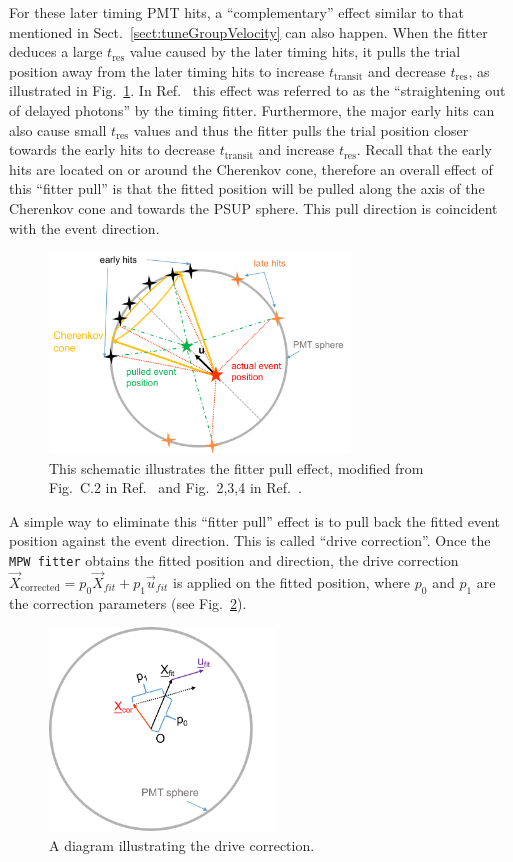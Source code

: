 For these later timing PMT hits, a ``complementary'' effect similar to that mentioned in Sect.~\ref{sect:tuneGroupVelocity} can also happen. When the fitter deduces a large $t_\mathrm{res}$ value caused by the later timing hits, it pulls the trial position away from the later timing hits to increase $t_\mathrm{transit}$ and decrease $t_\mathrm{res}$, as illustrated in Fig.~\ref{fitterPull}. In Ref.~\cite{driveCorPeter} this effect was referred to as the ``straightening out of delayed photons'' by the timing fitter. Furthermore, the major early hits can also cause small $t_\mathrm{res}$ values and thus the fitter pulls the trial position closer towards the early hits to decrease $t_\mathrm{transit}$ and increase $t_\mathrm{res}$. Recall that the early hits are located on or around the Cherenkov cone, therefore an overall effect of this ``fitter pull'' is that the fitted position will be pulled along the axis of the Cherenkov cone and towards the PSUP sphere. This pull direction is coincident with the event direction.

\begin{figure}[!htb]
	\centering
	\includegraphics[width=8cm]{fitterPull.png}
\caption[A cartoon shows fitter pull effect.]{This schematic illustrates the fitter pull effect, modified from Fig.~C.2 in Ref.~\cite{brice1996monte} and Fig.~2,3,4 in Ref.~\cite{driveCorPeter}.}
	\label{fitterPull}
\end{figure}

A simple way to eliminate this ``fitter pull'' effect is to pull back the fitted event position against the event direction. This is called ``drive correction''. Once the \texttt{MPW fitter} obtains the fitted position and direction, the drive correction $\vec{X}_{\mathrm{corrected}} = p_0\vec{X}_{fit}+p_1\vec{u}_{fit}$ is applied on the fitted position, where $p_0$ and $p_1$ are the correction parameters (see Fig.~\ref{drivecor}).
\begin{figure}[!htb]
	\centering
	\includegraphics[width=6cm]{driveCor.png}
	\caption{ A diagram illustrating the drive correction.}
	\label{drivecor}
\end{figure}


